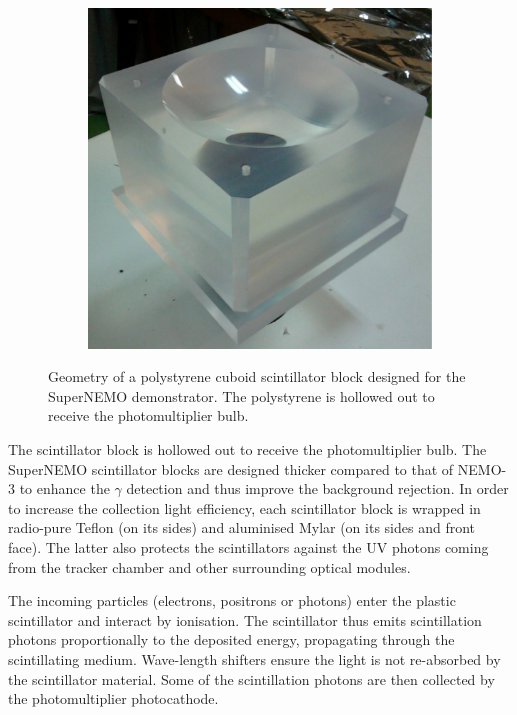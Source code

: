 \begin{figure}[!h]
\begin{subfigure}[t]{0.49\textwidth}
    \includegraphics[height=0.95\textwidth]{SNdemonstrator/fig_SNdemonstrator/scintillator_pic.pdf}
  \end{subfigure}
  \caption{Geometry of a polystyrene cuboid scintillator block designed for the SuperNEMO demonstrator.
    The polystyrene is hollowed out to receive the photomultiplier bulb.
    \label{fig:scintillator_design}}
\end{figure}
The scintillator block is hollowed out to receive the photomultiplier bulb.
The SuperNEMO scintillator blocks are designed thicker compared to that of NEMO-$3$ to enhance the $\gamma$ detection and thus improve the background rejection.
In order to increase the collection light efficiency, each scintillator block is wrapped in radio-pure Teflon (on its sides) and aluminised Mylar (on its sides and front face).
The latter also protects the scintillators against the UV photons coming from the tracker chamber and other surrounding optical modules.

The incoming particles (electrons, positrons or photons) enter the plastic scintillator and interact by ionisation.
The scintillator thus emits scintillation photons proportionally to the deposited energy, propagating through the scintillating medium.
Wave-length shifters ensure the light is not re-absorbed by the scintillator material.
Some of the scintillation photons are then collected by the photomultiplier photocathode.


